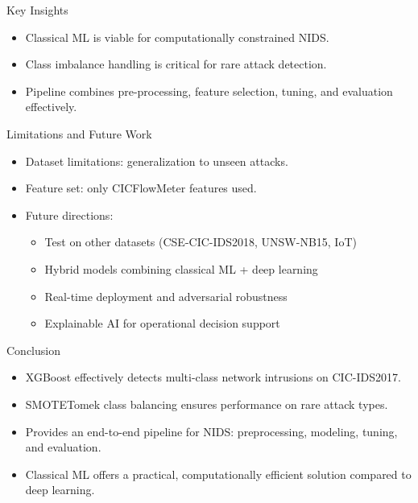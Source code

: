 \documentclass{beamer}
\begin{document}
\begin{frame}{Key Insights}
\begin{itemize}
    \item Classical ML is viable for computationally constrained NIDS.
    \item Class imbalance handling is critical for rare attack detection.
    \item Pipeline combines pre-processing, feature selection, tuning, and evaluation effectively.
\end{itemize}
\end{frame}

\begin{frame}{Limitations and Future Work}
\begin{itemize}
    \item Dataset limitations: generalization to unseen attacks.
    \item Feature set: only CICFlowMeter features used.
    \item Future directions:
    \begin{itemize}
        \item Test on other datasets (CSE-CIC-IDS2018, UNSW-NB15, IoT)
        \item Hybrid models combining classical ML + deep learning
        \item Real-time deployment and adversarial robustness
        \item Explainable AI for operational decision support
    \end{itemize}
\end{itemize}
\end{frame}

\begin{frame}{Conclusion}
\begin{itemize}
    \item XGBoost effectively detects multi-class network intrusions on CIC-IDS2017.
    \item SMOTETomek class balancing ensures performance on rare attack types.
    \item Provides an end-to-end pipeline for NIDS: preprocessing, modeling, tuning, and evaluation.
    \item Classical ML offers a practical, computationally efficient solution compared to deep learning.
\end{itemize}
\end{frame}

\frame{\titlepage}
\end{document}
